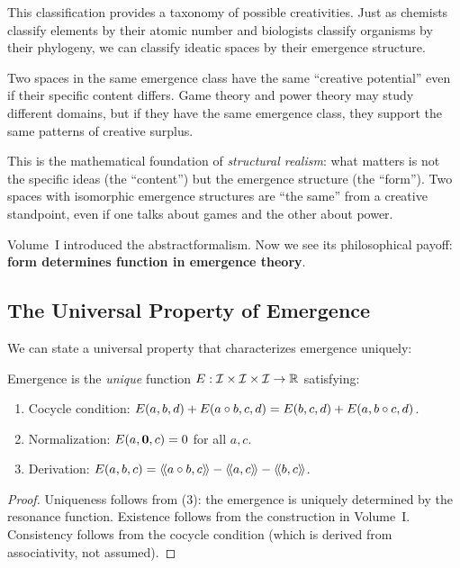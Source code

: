 \begin{interpretation}
This classification provides a taxonomy of possible creativities. Just as
chemists classify elements by their atomic number and biologists classify
organisms by their phylogeny, we can classify ideatic spaces by their emergence
structure.

Two spaces in the same emergence class have the same ``creative potential''
even if their specific content differs. Game theory and power theory may
study different domains, but if they have the same emergence class, they
support the same patterns of creative surplus.

This is the mathematical foundation of \emph{structural realism}: what matters
is not the specific ideas (the ``content'') but the emergence structure (the
``form''). Two spaces with isomorphic emergence structures are ``the same''
from a creative standpoint, even if one talks about games and the other about
power.

Volume~I introduced the abstractformalism. Now we see its philosophical payoff:
\textbf{form determines function in emergence theory}.
\end{interpretation}

\subsection{The Universal Property of Emergence}

We can state a universal property that characterizes emergence uniquely:

\begin{theorem}
\label{thm:universal-property}
Emergence is the \emph{unique} function $E : \mathcal{I} \times \mathcal{I} \times \mathcal{I} \to \mathbb{R}$
satisfying:
\begin{enumerate}
  \item Cocycle condition: $E(a,b,d) + E(a \circ b, c, d) = E(b,c,d) + E(a, b \circ c, d)$.
  \item Normalization: $E(a, \mathbf{0}, c) = 0$ for all $a, c$.
  \item Derivation: $E(a, b, c) = \langle\!\langle a \circ b, c \rangle\!\rangle - \langle\!\langle a, c \rangle\!\rangle - \langle\!\langle b, c \rangle\!\rangle$.
\end{enumerate}
\end{theorem}

\begin{proof}
Uniqueness follows from (3): the emergence is uniquely determined by the
resonance function. Existence follows from the construction in Volume~I.
Consistency follows from the cocycle condition (which is derived from
associativity, not assumed).
\end{proof}

